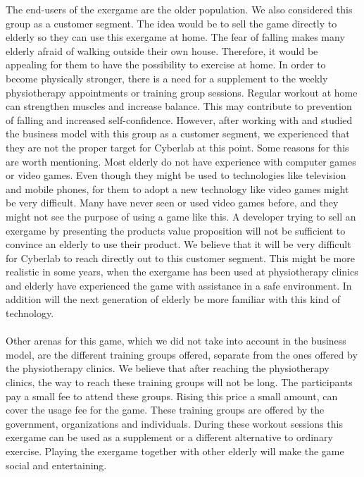 The end-users of the exergame are the older population. We also considered this group as a customer segment. The idea would be to sell the game directly to elderly so they can use this exergame at home. The fear of falling makes many elderly afraid of walking outside their own house. Therefore, it would be appealing for them to have the possibility to exercise at home. In order to become physically stronger, there is a need for a supplement to the weekly physiotherapy appointments or training group sessions. Regular workout at home can strengthen muscles and increase balance.  This may contribute to prevention of falling and increased self-confidence. However, after working with and studied the business model with this group as a customer segment, we experienced that they are not the proper target for Cyberlab at this point. Some reasons for this are worth mentioning. Most elderly do not have experience with computer games or video games. Even though they might be used to technologies like television and mobile phones, for them to adopt a new technology like video games might be very difficult. Many have never seen or used video games before, and they might not see the purpose of using a game like this. A developer trying to sell an exergame by presenting the products value proposition will not be sufficient to convince an elderly to use their product. We believe that it will be very difficult for Cyberlab to reach directly out to this customer segment. This might be more realistic in some years, when the exergame has been used at physiotherapy clinics and elderly have experienced the game with assistance in a safe environment. In addition will the next generation of elderly be more familiar with this kind of technology.  \\ \\
Other arenas for this game, which we did not take into account in the business model, are the different training groups offered, separate from the ones offered by the physiotherapy clinics. We believe that after reaching the physiotherapy clinics, the way to reach these training groups will not be long. The participants pay a small fee to attend these groups. Rising this price a small amount, can cover the usage fee for the game. These training groups are offered by the government, organizations and individuals. During these workout sessions this exergame can be used as a supplement or a different alternative to ordinary exercise. Playing the exergame together with other elderly will make the game social and entertaining. \\ \\
